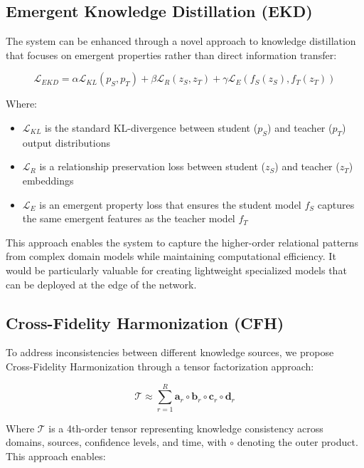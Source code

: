 \documentclass[journal,onecolumn]{IEEEtran}
\begin{document}
\subsection{Emergent Knowledge Distillation (EKD)}

The system can be enhanced through a novel approach to knowledge distillation that focuses on emergent properties rather than direct information transfer:

\begin{equation}
\mathcal{L}_{EKD} = \alpha\mathcal{L}_{KL}(p_S, p_T) + \beta\mathcal{L}_{R}(z_S, z_T) + \gamma\mathcal{L}_{E}(f_S(z_S), f_T(z_T))
\end{equation}

Where:
\begin{itemize}
\item $\mathcal{L}_{KL}$ is the standard KL-divergence between student ($p_S$) and teacher ($p_T$) output distributions
\item $\mathcal{L}_{R}$ is a relationship preservation loss between student ($z_S$) and teacher ($z_T$) embeddings
\item $\mathcal{L}_{E}$ is an emergent property loss that ensures the student model $f_S$ captures the same emergent features as the teacher model $f_T$
\end{itemize}

This approach enables the system to capture the higher-order relational patterns from complex domain models while maintaining computational efficiency. It would be particularly valuable for creating lightweight specialized models that can be deployed at the edge of the network.

\subsection{Cross-Fidelity Harmonization (CFH)}

To address inconsistencies between different knowledge sources, we propose Cross-Fidelity Harmonization through a tensor factorization approach:

\begin{equation}
\mathcal{T} \approx \sum_{r=1}^{R} \mathbf{a}_r \circ \mathbf{b}_r \circ \mathbf{c}_r \circ \mathbf{d}_r
\end{equation}

Where $\mathcal{T}$ is a 4th-order tensor representing knowledge consistency across domains, sources, confidence levels, and time, with $\circ$ denoting the outer product. This approach enables:
\end{document}
